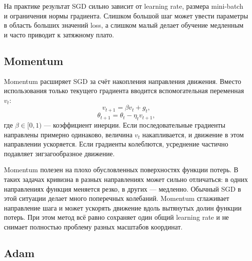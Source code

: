 На практике результат SGD сильно зависит от learning rate, размера mini-batch и ограничения нормы градиента. Слишком большой шаг может увести параметры в область больших значений loss, а слишком малый делает обучение медленным и часто приводит к затяжному плато.

\subsection{Momentum}

Momentum расширяет SGD за счёт накопления направления движения. Вместо использования только текущего градиента вводится вспомогательная переменная \(v_t\):
\begin{equation}
    v_{t+1}
    =
    \beta v_t
    +
    g_t,
\end{equation}
\begin{equation}
    \theta_{t+1}
    =
    \theta_t
    -
    \eta_t v_{t+1},
\end{equation}
где \(\beta\in[0,1)\) --- коэффициент инерции. Если последовательные градиенты направлены примерно одинаково, величина \(v_t\) накапливается, и движение в этом направлении ускоряется. Если градиенты колеблются, усреднение частично подавляет зигзагообразное движение.

Momentum полезен на плохо обусловленных поверхностях функции потерь. В таких задачах кривизна в разных направлениях может сильно отличаться: в одних направлениях функция меняется резко, в других --- медленно. Обычный SGD в этой ситуации делает много поперечных колебаний. Momentum сглаживает направление шага и может ускорять движение вдоль вытянутых долин функции потерь. При этом метод всё равно сохраняет один общий learning rate и не снимает полностью проблему разных масштабов координат.

\subsection{Adam}

